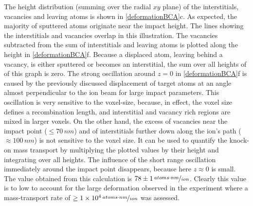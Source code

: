 The height distribution (summing over the radial $xy$ plane) of the interstitials, vacancies and leaving atoms is shown in \ref{deformationBCA}c. As expected, the majority of sputtered atoms originate near the impact height. The lines showing the interstitials and vacancies overlap in this illustration. The vacancies subtracted from the sum of interstitials and leaving atoms is plotted along the height in \ref{deformationBCA}f. Because a displaced atom, leaving behind a vacancy, is either sputtered or becomes an interstitial, the sum over all heights of of this graph is zero. The strong oscillation around $z=0$ in \ref{deformationBCA}f is caused by the previously discussed displacement of target atoms at an angle almost perpendicular to the ion beam for large impact parameters. This oscillation is very sensitive to the voxel-size, because, in effect, the voxel size defines a recombination length, and interstitial and vacancy rich regions are mixed in larger voxels. On the other hand, the excess of vacancies near the impact point ($\le 70\,nm$) and of interstitials further down along the ion's path ($\approx 100\,nm$) is not sensitive to the voxel size. It can be used to quantify the knock-on mass transport by multiplying the plotted values by their height and integrating over all heights. The influence of the short range oscillation immediately around the impact point disappears, because here $z \approx 0$ is small. The value obtained from this calculation is $78\pm1\,\nicefrac{atoms \cdot nm}{ion}$. Clearly this value is to low to account for the large deformation observed in the experiment where a mass-transport rate of $\ge 1\times 10^{4}\,\nicefrac{atoms \cdot nm}{ion}$ was assessed.

